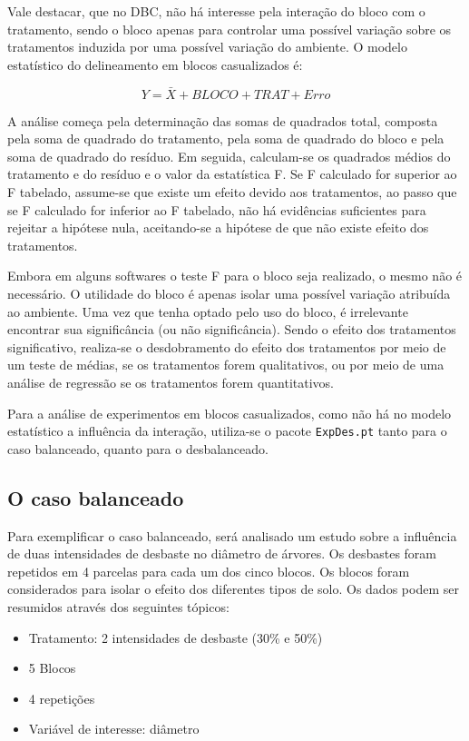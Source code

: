 \documentclass[
]{article}
\providecommand{\tightlist}{%
  \setlength{\itemsep}{0pt}\setlength{\parskip}{0pt}}
\begin{document}
Vale destacar, que no DBC, não há interesse pela interação do bloco com o tratamento, sendo o bloco apenas para controlar uma possível variação sobre os tratamentos induzida por uma possível variação do ambiente. O modelo estatístico do delineamento em blocos casualizados é:

\[Y = \bar{X} + BLOCO + TRAT + Erro\]

A análise começa pela determinação das somas de quadrados total, composta pela soma de quadrado do tratamento, pela soma de quadrado do bloco e pela soma de quadrado do resíduo. Em seguida, calculam-se os quadrados médios do tratamento e do resíduo e o valor da estatística F. Se F calculado for superior ao F tabelado, assume-se que existe um efeito devido aos tratamentos, ao passo que se F calculado for inferior ao F tabelado, não há evidências suficientes para rejeitar a hipótese nula, aceitando-se a hipótese de que não existe efeito dos tratamentos.

Embora em alguns softwares o teste F para o bloco seja realizado, o mesmo não é necessário. O utilidade do bloco é apenas isolar uma possível variação atribuída ao ambiente. Uma vez que tenha optado pelo uso do bloco, é irrelevante encontrar sua significância (ou não significância). Sendo o efeito dos tratamentos significativo, realiza-se o desdobramento do efeito dos tratamentos por meio de um teste de médias, se os tratamentos forem qualitativos, ou por meio de uma análise de regressão se os tratamentos forem quantitativos.

Para a análise de experimentos em blocos casualizados, como não há no modelo estatístico a influência da interação, utiliza-se o pacote \texttt{ExpDes.pt} tanto para o caso balanceado, quanto para o desbalanceado.

\hypertarget{o-caso-balanceado-1}{%
\subsection{O caso balanceado}\label{o-caso-balanceado-1}}

Para exemplificar o caso balanceado, será analisado um estudo sobre a influência de duas intensidades de desbaste no diâmetro de árvores. Os desbastes foram repetidos em 4 parcelas para cada um dos cinco blocos. Os blocos foram considerados para isolar o efeito dos diferentes tipos de solo. Os dados podem ser resumidos através dos seguintes tópicos:

\begin{itemize}
\tightlist
\item
  Tratamento: 2 intensidades de desbaste (30\% e 50\%)
\item
  5 Blocos
\item
  4 repetições
\item
  Variável de interesse: diâmetro
\end{itemize}
\end{document}
